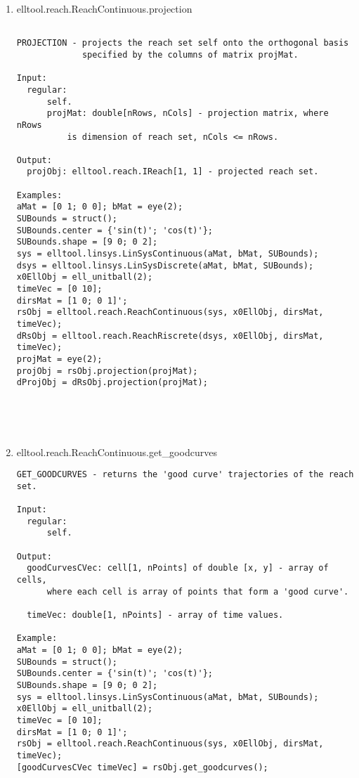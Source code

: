\begin{enumerate}
\begin{lstlisting}
\end{lstlisting}
\fontfamily{\familydefault}
\selectfont
\item {elltool.reach.ReachContinuous.projection}
\selectfont
\begin{lstlisting}

PROJECTION - projects the reach set self onto the orthogonal basis
             specified by the columns of matrix projMat.

Input:
  regular:
      self.
      projMat: double[nRows, nCols] - projection matrix, where nRows
          is dimension of reach set, nCols <= nRows.

Output:
  projObj: elltool.reach.IReach[1, 1] - projected reach set.

Examples:
aMat = [0 1; 0 0]; bMat = eye(2);
SUBounds = struct();
SUBounds.center = {'sin(t)'; 'cos(t)'};
SUBounds.shape = [9 0; 0 2];
sys = elltool.linsys.LinSysContinuous(aMat, bMat, SUBounds);
dsys = elltool.linsys.LinSysDiscrete(aMat, bMat, SUBounds);
x0EllObj = ell_unitball(2);
timeVec = [0 10];
dirsMat = [1 0; 0 1]';
rsObj = elltool.reach.ReachContinuous(sys, x0EllObj, dirsMat, timeVec);
dRsObj = elltool.reach.ReachRiscrete(dsys, x0EllObj, dirsMat, timeVec);
projMat = eye(2);
projObj = rsObj.projection(projMat);
dProjObj = dRsObj.projection(projMat);





\end{lstlisting}
\fontfamily{\familydefault}
\selectfont
\item {elltool.reach.ReachContinuous.get\_goodcurves}
\selectfont
\begin{lstlisting}
GET_GOODCURVES - returns the 'good curve' trajectories of the reach set.

Input:
  regular:
      self.

Output:
  goodCurvesCVec: cell[1, nPoints] of double [x, y] - array of cells,
      where each cell is array of points that form a 'good curve'.

  timeVec: double[1, nPoints] - array of time values.

Example:
aMat = [0 1; 0 0]; bMat = eye(2);
SUBounds = struct();
SUBounds.center = {'sin(t)'; 'cos(t)'};
SUBounds.shape = [9 0; 0 2];
sys = elltool.linsys.LinSysContinuous(aMat, bMat, SUBounds);
x0EllObj = ell_unitball(2);
timeVec = [0 10];
dirsMat = [1 0; 0 1]';
rsObj = elltool.reach.ReachContinuous(sys, x0EllObj, dirsMat, timeVec);
[goodCurvesCVec timeVec] = rsObj.get_goodcurves();


\end{lstlisting}
\end{enumerate}
